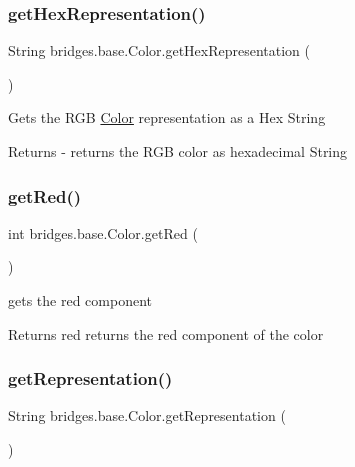 \subsubsection{\texorpdfstring{get\+Hex\+Representation()}{getHexRepresentation()}}
{\footnotesize\ttfamily String bridges.\+base.\+Color.\+get\+Hex\+Representation (\begin{DoxyParamCaption}{ }\end{DoxyParamCaption})}

Gets the R\+GB \hyperlink{classbridges_1_1base_1_1_color}{Color} representation as a Hex String

\begin{DoxyReturn}{Returns}
-\/ returns the R\+GB color as hexadecimal String 
\end{DoxyReturn}
\mbox{\label{classbridges_1_1base_1_1_color_af1a30dc925b35d6bfe609f8838651025}} 
\subsubsection{\texorpdfstring{get\+Red()}{getRed()}}
{\footnotesize\ttfamily int bridges.\+base.\+Color.\+get\+Red (\begin{DoxyParamCaption}{ }\end{DoxyParamCaption})}

gets the red component

\begin{DoxyReturn}{Returns}
red returns the red component of the color 
\end{DoxyReturn}
\mbox{\label{classbridges_1_1base_1_1_color_a2f9b0cb588e49b2ebf2f015d4d7507d0}} 
\subsubsection{\texorpdfstring{get\+Representation()}{getRepresentation()}}
{\footnotesize\ttfamily String bridges.\+base.\+Color.\+get\+Representation (\begin{DoxyParamCaption}{ }\end{DoxyParamCaption})}

